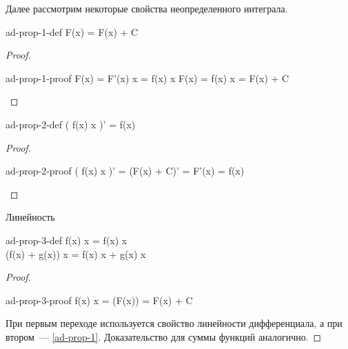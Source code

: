 Далее рассмотрим некоторые свойства неопределенного интеграла.

\begin{lemma}\label{ad-prop-1}
  \begin{lequation}{ad-prop-1-def}
    \int \dd F(x) = F(x) + C
  \end{lequation}
\end{lemma}
\begin{proof}
  \begin{lequation}{ad-prop-1-proof}
    \dd F(x) = F'(x) \dd x = f(x) \dd x
    \implies
    \int \dd F(x) = \int f(x) \dd x = \dd F(x) + C
  \end{lequation}
\end{proof}

\begin{lemma}
  \begin{lequation}{ad-prop-2-def}
    \left( \int f(x) \dd x \right)' = f(x)
  \end{lequation}
\end{lemma}
\begin{proof}
  \begin{lequation}{ad-prop-2-proof}
    \left( \int f(x) \dd x \right)' = (F(x) + C)' = F'(x) = f(x)
  \end{lequation}
\end{proof}

\begin{lemma}
  Линейность

  \begin{lequation}{ad-prop-3-def}
    \int \alpha f(x) \dd x = \alpha \int f(x) \dd x \\
    \int (f(x) + g(x)) \dd x = \int f(x) \dd x + \int g(x) \dd x
  \end{lequation}
\end{lemma}
\begin{proof}
  \begin{lequation}{ad-prop-3-proof}
    \int \alpha f(x) \dd x
    = \int \dd (\alpha F(x))
    = \alpha F(x) + C
  \end{lequation}

  При первым переходе используется свойство линейности дифференциала,
  а при втором~--- \ref{ad-prop-1}. Доказательство для суммы функций аналогично.
\end{proof}

    
    
